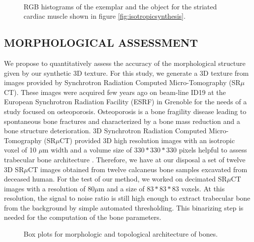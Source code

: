 \begin{figure}
 \vspace{-0.2cm}
 \centering  
 \\
 \caption{RGB histograms of the exemplar and the object for the striated
          cardiac muscle shown in figure \ref{fig:isotropicsynthesis}.}
 \label{fig:histograms}
 \vspace{-0.1cm}
\end{figure}

\subsection{\uppercase{Morphological assessment}}
\label{sec:Morphology}

We propose to quantitatively assess the accuracy of the morphological structure given by our 
synthetic 3D texture. For this study, we generate a 3D texture from images provided 
by Synchrotron Radiation Computed Micro-Tomography (SR$\mu$CT). 
These images were acquired few years ago on beam-line ID19 at the European Synchrotron Radiation Facility 
(ESRF) in Grenoble for the needs of a study focused on osteoporosis. 
Osteoporosis is a bone fragility disease leading to spontaneous bone fractures and 
characterized by a bone mass reduction and a bone structure deterioration. 
3D Synchrotron Radiation Computed Micro-Tomography (SR$\mu$CT) provided 3D high resolution 
images with an isotropic voxel of 10 $\mu$m width and a volume size of 
$330 * 330 * 330$ pixels helpful to assess trabecular bone architecture \cite{revol2002}. 
Therefore, we have at our disposal a set of twelve 3D SR$\mu$CT images obtained from 
twelve calcaneus bone samples excavated from deceased human. 
For the test of our method, we worked on decimated SR$\mu$CT images with a resolution of 
80$\mu$m and a size of $83 * 83 * 83$ voxels. 
At this resolution, the signal to noise ratio is still high enough to extract trabecular 
bone from the background by simple automated thresholding. 
This binarizing step is needed for the computation of the bone parameters.

\begin{figure}
 \vspace{-0.2cm}
 \centering  
 \caption{Box plots for morphologic and topological architecture of bones.}
 \label{fig:bone_parametres}
 \vspace{-0.1cm}
\end{figure}

